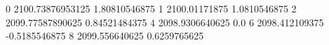 0 2100.73876953125 1.80810546875
1 2100.01171875 1.0810546875
2 2099.77587890625 0.84521484375
4 2098.9306640625 0.0
6 2098.412109375 -0.5185546875
8 2099.556640625 0.6259765625
